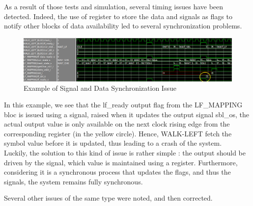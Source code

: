 As a result of those tests and simulation, several timing issues have been detected. Indeed, the use of register to store the data and signals as flags to notify other blocks of data availability led to several synchronization problems. 

\begin{figure}[H]
    \centering
    \hspace*{-10mm}\includegraphics[scale = 0.45]{Figures/lf_timing_issue.png}
    \caption{Example of Signal and Data Synchronization Issue}
    \label{fig:lf_timing}
\end{figure}

In this example, we see that the \textrm{lf\_ready} output flag from the LF\_MAPPING bloc is issued using a signal, raised when it updates the output signal \textrm{sbl\_os}, the actual output value is only available on the next clock rising edge from the corresponding register (in the yellow circle). Hence, WALK-LEFT fetch the symbol value before it is updated, thus leading to a crash of the system. \\

Luckily, the solution to this kind of issue is rather simple : the output should be driven by the signal, which value is maintained using a register. Furthermore, considering it is a synchronous process that updates the flags, and thus the signals, the system remains fully synchronous.

Several other issues of the same type were noted, and then corrected.
